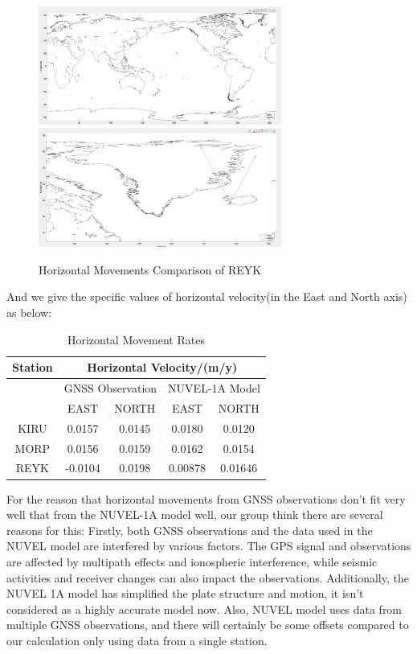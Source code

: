 \documentclass{article}
\begin{document}
  \begin{figure}[H]
    \centering
    {
    \includegraphics[width=8cm]{../result/re_figure/fig_REYK/截屏/figure4_new.jpg}}
    \hspace{3pt}    
    {
    \includegraphics[width=8cm]{../result/re_figure/fig_REYK/截屏/figure4(zoomup).jpg}}
    \caption{Horizontal Movements Comparison of REYK}
    \label{fig:Vel_REYK}
  \end{figure}

And we give the specific values of horizontal velocity(in the East and North axis) as below:
\vspace{6pt}
\begin{table}[htbp]
  \centering
  \caption{Horizontal Movement Rates}
    \begin{tabular}{ccc|cc}
    \large Station & \multicolumn{4}{c}{\large Horizontal Velocity/(m/y)} \\[5pt]
    \midrule
          & \multicolumn{2}{c}{GNSS Observation} & \multicolumn{2}{c}{NUVEL-1A Model} \\[3pt]
          & EAST  & \multicolumn{1}{c}{NORTH} & EAST  &  NORTH \\[4pt]
    \large KIRU  & 0.0157 & 0.0145 & 0.0180 & 0.0120 \\[4pt]
    \large MORP  &  0.0156 & 0.0159 &  0.0162 & 0.0154 \\[4pt]
    \large REYK  & -0.0104 & 0.0198 &  0.00878 & 0.01646 \\
    \end{tabular}%
  \label{tab:Hori_vel}%
\end{table}%

For the reason that horizontal movements from GNSS observations don't fit very well that from the NUVEL-1A model well,
our group think there are several reasons for this: 
Firstly, both GNSS observations and the data used in the NUVEL model are interfered by various factors. 
The GPS signal and observations are affected by multipath effects and ionospheric interference, 
while seismic activities and receiver changes can also impact the observations. 
Additionally, the NUVEL 1A model has simplified the plate structure and motion, it isn't considered as a highly accurate model now. 
Also, NUVEL model uses data from multiple GNSS observations, 
and there will certainly be some offsets compared to our calculation only using data from a single station.
\end{document}
